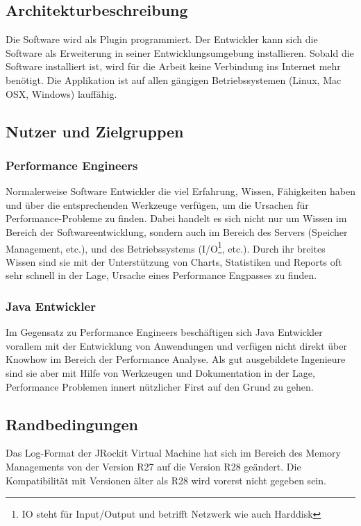 \subsection{Architekturbeschreibung}
Die Software wird als Plugin programmiert. Der Entwickler kann sich die Software als Erweiterung in seiner Entwicklungsumgebung installieren. Sobald die Software installiert ist, wird für die Arbeit keine Verbindung ins Internet mehr benötigt. Die Applikation ist auf allen gängigen Betriebssystemen (Linux, Mac OSX, Windows) lauffähig.

\subsection{Nutzer und Zielgruppen}
\subsubsection{Performance Engineers}
Normalerweise Software Entwickler die viel Erfahrung, Wissen, Fähigkeiten haben und über die entsprechenden Werkzeuge verfügen, um die Ursachen für Performance-Probleme zu finden. Dabei handelt es sich nicht nur um Wissen im Bereich der Softwareentwicklung, sondern auch im Bereich des Servers (Speicher Management, etc.), und des Betriebssystems (I/O\footnote{IO steht für Input/Output und betrifft Netzwerk wie auch Harddisk}, etc.). Durch ihr breites Wissen sind sie mit der Unterstützung von Charts, Statistiken und Reports oft sehr schnell in der Lage, Ursache eines Performance Engpasses zu finden.

\subsubsection{Java Entwickler}
Im Gegensatz zu Performance Engineers beschäftigen sich Java Entwickler vorallem mit der Entwicklung von Anwendungen und verfügen nicht direkt über Knowhow im Bereich der Performance Analyse. Als gut ausgebildete Ingenieure sind sie aber mit Hilfe von Werkzeugen und Dokumentation in der Lage, Performance Problemen innert nützlicher First auf den Grund zu gehen.

\subsection{Randbedingungen}\label{randbedingungen}
Das Log-Format der JRockit Virtual Machine hat sich im Bereich des Memory Managements von der Version R27 auf die Version R28 geändert. Die Kompatibilität mit Versionen älter als R28 wird vorerst nicht gegeben sein.
